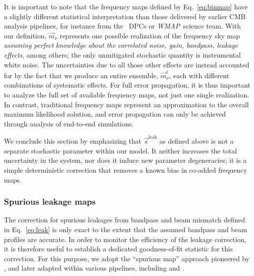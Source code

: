 \documentclass[onecolumn]{aa}
\def\WMAP{\emph{WMAP}}
\newcommand{\s}[0]{\vec{s}}
\newcommand{\m}[0]{\vec{m}}
\begin{document}
It is important to note that the frequency maps defined by
Eq.~\eqref{eq:binmap} have a slightly different statistical
interpretation than those delivered by earlier CMB analysis pipelines,
for instance from the \Planck\ DPCs or \WMAP\ science team. With our
definition, $\m_{\nu}$ represents one possible realization of the
frequency sky map \emph{assuming perfect knowledge about the
  correlated noise, gain, bandpass, leakage effects}, among others; the only
unmitigated stochastic quantity is instrumental white noise. The
uncertainties due to all those other effects are instead accounted for
by the fact that we produce an entire ensemble, $\m_{\nu}^i$, each
with different combinations of systematic effects. For full error
propagation, it is thus important to analyze the full set of available
frequency maps, not just one single realization. In contrast,
traditional frequency maps represent an approximation to the overall
maximum likelihood solution, and error propagation can only be
achieved through analysis of end-to-end simulations.

We conclude this section by emphasizing that $\s^{\mathrm{leak}}$ as
defined above is not a separate stochastic parameter within our
model. It neither increases the total uncertainty in the system, nor
does it induce new parameter degeneracies; it is a simple
deterministic correction that removes a known bias in co-added
frequency maps.

\subsubsection{Spurious leakage maps}
\label{sec:leakmaps}

The correction for spurious leakages from bandpass and beam mismatch
defined in Eq.~\eqref{eq:leak} is only exact to the extent that the
assumed bandpass and beam profiles are accurate. In order to monitor
the efficiency of the leakage correction, it is therefore useful to
establish a dedicated goodness-of-fit statistic for this correction.
For this purpose, we adopt the ``spurious map'' approach pioneered by
\citet{page2007}, and later adapted within various pipelines,
including \citet{planck2016-l02} and \citet{planck2020-LVII}.
\end{document}
